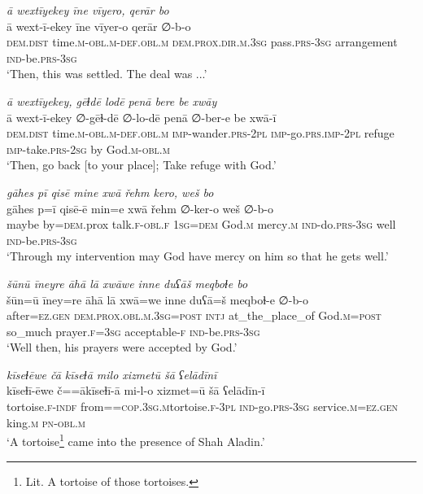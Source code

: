\ea \label{DG.55}
\textit{ā wextīyekey īne vīyero, qerār bo} \\ 
\gll ā wext-ī-ekey īne vīyer-o qerār ∅-b-o \\ 
 \textsc{dem.dist} time\textsc{.m}\textsc{-obl}\textsc{.m}\textsc{-def}\textsc{.obl}\textsc{.m} \textsc{dem.prox}\textsc{.dir}\textsc{.m}\textsc{.3sg} pass\textsc{.prs}\textsc{-3sg} arrangement \textsc{ind-}be\textsc{.prs}\textsc{-3sg} \\ 
\glt `Then, this was settled. The deal was ...'
\z 
 
\ea \label{DG.58}
\textit{ā wextīyekey, gēɫdē lodē penā bere be xwāy} \\ 
\gll ā wext-ī-ekey ∅-gēɫ-dē ∅-lo-dē penā ∅-ber-e be xwā-ī \\ 
 \textsc{dem.dist} time\textsc{.m}\textsc{-obl}\textsc{.m}\textsc{-def}\textsc{.obl}\textsc{.m} \textsc{imp-}wander\textsc{.prs}\textsc{-2pl} \textsc{imp-}go\textsc{.prs}\textsc{.imp}\textsc{-2pl} refuge \textsc{imp-}take\textsc{.prs}-\textsc{2sg} by God\textsc{.m}\textsc{-obl}\textsc{.m} \\ 
\glt `Then, go back [to your place]; Take refuge with God.'
\z 
 
\ea \label{DG.59}
\textit{gāhes pī qisē mine xwā řehm kero, weš bo} \\ 
\gll gāhes p=ī qisē-ē min=e xwā řehm ∅-ker-o weš ∅-b-o \\ 
 maybe by\textsc{=dem}.prox talk\textsc{\textsc{.f}}\textsc{-obl}\textsc{\textsc{.f}} \textsc{1sg}\textsc{=dem} God\textsc{.m} mercy\textsc{.m} \textsc{ind-}do\textsc{.prs}\textsc{-3sg} well \textsc{ind-}be\textsc{.prs}\textsc{-3sg} \\ 
\glt `Through my intervention may God have mercy on him so that he gets well.'
\z 
 
\ea \label{DG.60}
\textit{šūnū īneyre āhā lā xwāwe inne duʕāš meqboɫe bo} \\ 
\gll šūn=ū īney=re āhā lā xwā=we inne duʕā=š meqboɫ-e ∅-b-o \\ 
 after\textsc{=ez}\textsc{.gen} \textsc{dem.prox}\textsc{.obl}\textsc{.m}\textsc{.3sg}\textsc{=\textsc{post}} \textsc{intj} at\_the\_place\_of God\textsc{.m}\textsc{=\textsc{post}} so\_much prayer\textsc{\textsc{.f}}\textsc{=3sg} acceptable\textsc{-f} \textsc{ind-}be\textsc{.prs}\textsc{-3sg} \\ 
\glt `Well then, his prayers were accepted by God.'
\z 
 
\ea \label{DG.61}
\textit{kīseɫēwe čā kīseɫā milo xizmetū šā ʕelādīnī} \\ 
\gll kīseɫī-ēwe č==ākīseɫī-ā mi-l-o xizmet=ū šā ʕelādīn-ī \\ 
 tortoise\textsc{\textsc{.f}}\textsc{-indf} from=\textsc{=cop}\textsc{.3sg}\textsc{.m}tortoise\textsc{\textsc{.f}}\textsc{-3pl} \textsc{ind-}go\textsc{.prs}\textsc{-3sg} service\textsc{.m}\textsc{=ez}\textsc{.gen} king\textsc{.m} \textsc{pn}\textsc{-obl}\textsc{.m} \\ 
\glt `A tortoise\footnote{Lit. A tortoise of those tortoises.}  came into the presence of Shah Aladin.'
\z 
 
